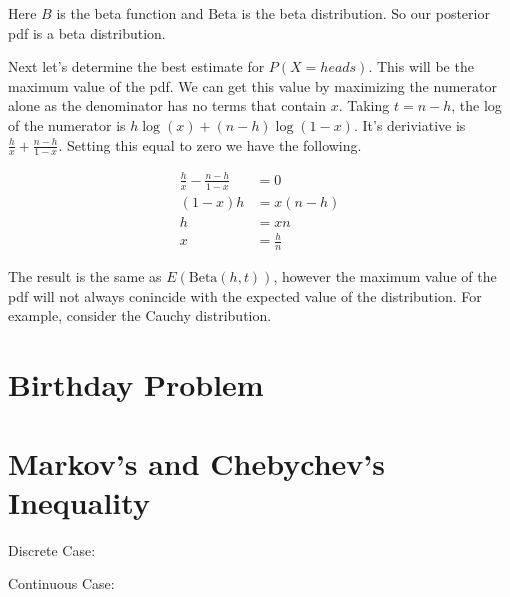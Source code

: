 \documentclass{article}
\begin{document}
Here $B$ is the beta function and $\text{Beta}$ is the beta distribution. So our posterior pdf is a beta distribution.

Next let's determine the best estimate for $P(X=heads)$. This will be the maximum value of the pdf. We
can get this value by maximizing the numerator alone as the denominator has no terms that contain
$x$. Taking $t=n-h$, the log of the numerator is $h\log(x) + (n-h)\log(1-x)$. It's deriviative 
is $\frac{h}{x} + \frac{n-h}{1-x}$. Setting this equal to zero we have the following.


\begin{align*}
  \displaystyle \frac{h}{x} - \frac{n-h}{1-x} &= 0 \\[1em]
  \displaystyle (1-x)h &= x(n-h) \\[1em]
  \displaystyle h &= xn  \\[1em]
  \displaystyle x &= \frac{h}{n}  
\end{align*}

The result is the same as $E(\text{Beta}(h,t))$, however the maximum value of the
pdf will not always conincide with the expected value of the distribution.
For example, consider the Cauchy distribution.







\section{Birthday Problem}

\section{Markov's and Chebychev's Inequality}

Discrete Case:

Continuous Case:
\end{document}
